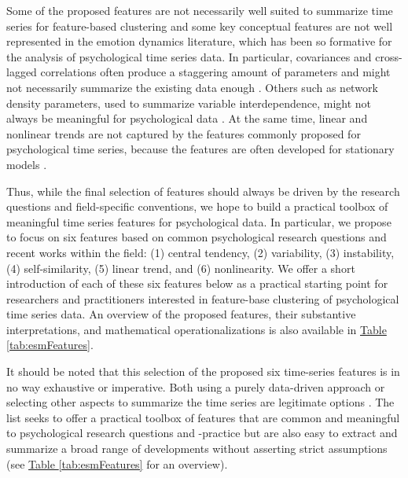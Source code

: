 \documentclass[man, 12pt, a4paper, mask, floatsintext]{apa7}
\theoremstyle{break}
\theoremstyle{plain}
\newcommand{\tblref}[2][]{\hyperref[#2]{Table \ref*{#2}#1}}
\begin{document}


Some of the proposed features are not necessarily well suited to summarize time series for feature-based clustering and some key conceptual features are not well represented in the emotion dynamics literature, which has been so formative for the analysis of psychological time series data. In particular, covariances and cross-lagged correlations often produce a staggering amount of parameters and might not necessarily summarize the existing data enough \citep{ernst2021}. Others such as network density parameters, used to summarize variable interdependence, might not always be meaningful for psychological data \citep{bringmann2019a}. At the same time, linear and nonlinear trends are not captured by the features commonly proposed for psychological time series, because the features are often developed for stationary models \citep[e.g.,][]{krone2018}. 

Thus, while the final selection of features should always be driven by the research questions and field-specific conventions, we hope to build a practical toolbox of meaningful time series features for psychological data. In particular, we propose to focus on six features based on common psychological research questions and recent works within the field: (1) central tendency, (2) variability, (3) instability, (4) self-similarity, (5) linear trend, and (6) nonlinearity. We offer a short introduction of each of these six features below as a practical starting point for researchers and practitioners interested in feature-base clustering of psychological time series data. An overview of the proposed features, their substantive interpretations, and mathematical operationalizations is also available in \tblref{tab:esmFeatures}.

It should be noted that this selection of the proposed six time-series features is in no way exhaustive or imperative. Both using a purely data-driven approach or selecting other aspects to summarize the time series are legitimate options \citep[e.g., see][]{heylen2016}. The list seeks to offer a practical toolbox of features that are common and meaningful to psychological research questions and -practice but are also easy to extract and summarize a broad range of developments without asserting strict assumptions (see \tblref{tab:esmFeatures} for an overview).
\end{document}
